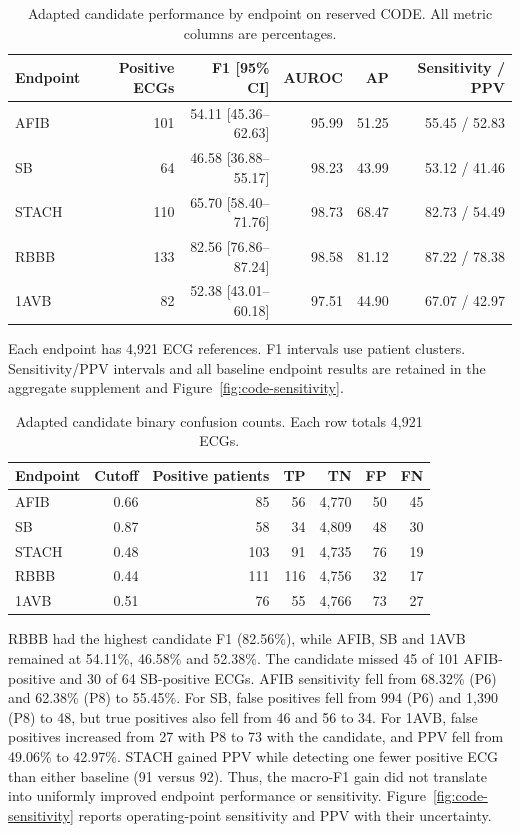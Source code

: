 \begin{table}[htbp]
\caption{Adapted candidate performance by endpoint on reserved CODE. All metric columns are percentages.\label{tab:code-class}}
\centering\small
\begin{tabular}{lrrrrr}
\toprule
Endpoint & Positive ECGs & F1 [95\% CI] & AUROC & AP & Sensitivity / PPV \\
\midrule
AFIB & 101 & 54.11 [45.36--62.63] & 95.99 & 51.25 & 55.45 / 52.83 \\
SB & 64 & 46.58 [36.88--55.17] & 98.23 & 43.99 & 53.12 / 41.46 \\
STACH & 110 & 65.70 [58.40--71.76] & 98.73 & 68.47 & 82.73 / 54.49 \\
RBBB & 133 & 82.56 [76.86--87.24] & 98.58 & 81.12 & 87.22 / 78.38 \\
1AVB & 82 & 52.38 [43.01--60.18] & 97.51 & 44.90 & 67.07 / 42.97 \\
\bottomrule
\end{tabular}
\par\smallskip\parbox{\linewidth}{\footnotesize Each endpoint has 4,921 ECG references. F1 intervals use patient clusters. Sensitivity/PPV intervals and all baseline endpoint results are retained in the aggregate supplement and Figure~\ref{fig:code-sensitivity}.}
\end{table}
\begin{table}[htbp]
\caption{Adapted candidate binary confusion counts. Each row totals 4,921 ECGs.\label{tab:code-counts}}
\centering\small
\begin{tabular}{lrrrrrr}
\toprule
Endpoint & Cutoff & Positive patients & TP & TN & FP & FN \\
\midrule
AFIB & 0.66 & 85 & 56 & 4,770 & 50 & 45 \\
SB & 0.87 & 58 & 34 & 4,809 & 48 & 30 \\
STACH & 0.48 & 103 & 91 & 4,735 & 76 & 19 \\
RBBB & 0.44 & 111 & 116 & 4,756 & 32 & 17 \\
1AVB & 0.51 & 76 & 55 & 4,766 & 73 & 27 \\
\bottomrule
\end{tabular}
\end{table}

RBBB had the highest candidate F1 (82.56\%), while AFIB, SB and 1AVB remained at 54.11\%, 46.58\% and 52.38\%. The candidate missed 45 of 101 AFIB-positive and 30 of 64 SB-positive ECGs. AFIB sensitivity fell from 68.32\% (P6) and 62.38\% (P8) to 55.45\%. For SB, false positives fell from 994 (P6) and 1,390 (P8) to 48, but true positives also fell from 46 and 56 to 34. For 1AVB, false positives increased from 27 with P8 to 73 with the candidate, and PPV fell from 49.06\% to 42.97\%. STACH gained PPV while detecting one fewer positive ECG than either baseline (91 versus 92). Thus, the macro-F1 gain did not translate into uniformly improved endpoint performance or sensitivity. Figure~\ref{fig:code-sensitivity} reports operating-point sensitivity and PPV with their uncertainty.

